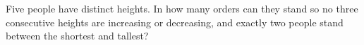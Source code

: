 Five people have distinct heights. In how many orders can they stand so no three consecutive heights are increasing or decreasing, and exactly two people stand between the shortest and tallest?
